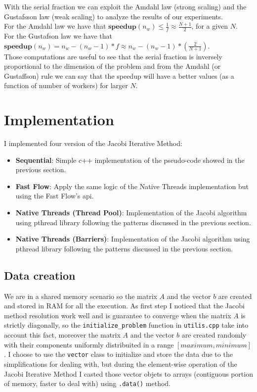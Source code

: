 \documentclass[12pt]{extarticle}
\begin{document}
With the serial fraction we can exploit the Amdahl law (strong scaling) and the Gustafsson law (weak scaling) to analyze the results of our experiments.\\
For the Amdahl law we have that $\textbf{speedup}(n_w) \leq \frac{1}{f} \approx \frac{N+1}{2}$, for a given $N$.\\
For the Gustafson law we have that $\textbf{speedup}(n_w) = n_w - (n_w - 1)*f \approx n_w - (n_w - 1)*(\frac{2}{N + 1})$.\\
Those computations are useful to see that the serial fraction is inversely proportional to the dimension of the problem and from the Amdahl (or Gustaffson) rule we can say that the speedup will have a better values (as a function of number of workers) for larger $N$.
\section{Implementation}
I implemented four version of the Jacobi Iterative Method:
\begin{itemize}
    \item \textbf{Sequential}: Simple c++ implementation of the pseudo-code showed in the previous section.
    \item \textbf{Fast Flow}: Apply the same logic of the Native Threads implementation but using the Fast Flow's api.
    \item \textbf{Native Threads (Thread Pool)}: Implementation of the Jacobi algorithm using pthread library following the patterns discussed in the previous section.
    \item \textbf{Native Threads (Barriers)}: Implementation of the Jacobi algorithm using pthread library following the patterns discussed in the previous section.
\end{itemize}

\subsection{Data creation}
We are in a shared memory scenario so the matrix $A$ and the vector $b$ are created and stored in RAM for all the execution. As first step I noticed that the Jacobi method resolution work well and is guarantee to converge when the matrix $A$ is strictly diagonally, so the \texttt{initialize\_problem} function in \texttt{utilis.cpp} take into account this fact, moreover the matrix $A$ and the vector $b$ are created randomly with their components uniformly distribuited in a range $[maximum, minimum]$.
I choose to use the \texttt{vector} class to initialize and store the data due to the simplifications for dealing with, but during the element-wise operation of the Jacobi Iterative Method I casted those vector objets to arrays (contiguous portion of memory, faster to deal with) using \texttt{.data()} method.
\end{document}
